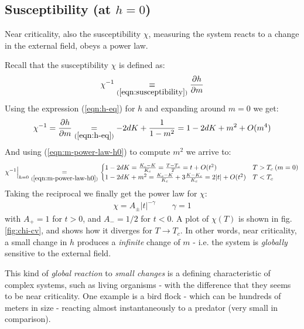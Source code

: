 \documentclass[../../main.tex]{subfiles}
\begin{document}
\subsection{Susceptibility (at $h=0$)}
Near criticality, also the susceptibility $\chi$, measuring  the system reacts to a change in the external field, obeys a power law.

\medskip

Recall that the susceptibility $\chi$ is defined as:
\begin{align*}
    \chi^{-1} \underset{(\ref{eqn:susceptibility})}{\equiv} \pdv{h}{m}   
\end{align*}
Using the expression (\ref{eqn:h-eq}) for $h$ and expanding around $m = 0$ we get:
\begin{align*}
    \chi^{-1} = \pdv{h}{m} \underset{(\ref{eqn:h-eq})}{=}  -2dK + \frac{1}{1-m^2}  = 1 - 2dK + m^2 + O(m^4)
\end{align*}
And using (\ref{eqn:m-power-law-h0}) to compute $m^2$ we arrive to:
\begin{align*}
    \chi^{-1} \Big|_{h=0} \underset{(\ref{eqn:m-power-law-h0})}{=} \begin{cases}
        1 - 2 d K = \frac{K_c-K}{K_c} = \frac{T-T_c}{T} = t+ O(t^2) & T > T_c \> (m=0)\\  
        1 - 2 dK + m^2 = \frac{K_c-K}{K_c} + 3\frac{K-K_c}{K_c} = 2|t| + O(t^2) & T<T_c 
    \end{cases}
\end{align*}
Taking the reciprocal we finally get the power law for $\chi$:
\begin{align}\label{eqn:susceptibility-power-law}
    \chi = A_\pm |t|^{-\gamma} \qquad \gamma = 1
\end{align}
with $A_+ = 1$ for $t > 0$, and $A_- = 1/2$ for $t<0$. A plot of $\chi(T)$ is shown in fig. \ref{fig:chi-cv}, and shows how it diverges for $T \to T_c$. In other words, near criticality, a small change in $h$ produces a \textit{infinite} change of $m$ - i.e. the system is \textit{globally} sensitive to the external field.

\medskip

This kind of \textit{global reaction} to \textit{small changes} is a defining characteristic of complex systems, such as living organisms - with the difference that they seems to  be near criticality. One example is a bird flock - which can be hundreds of meters in size - reacting almost instantaneously to a predator (very small in comparison). 
\end{document}
